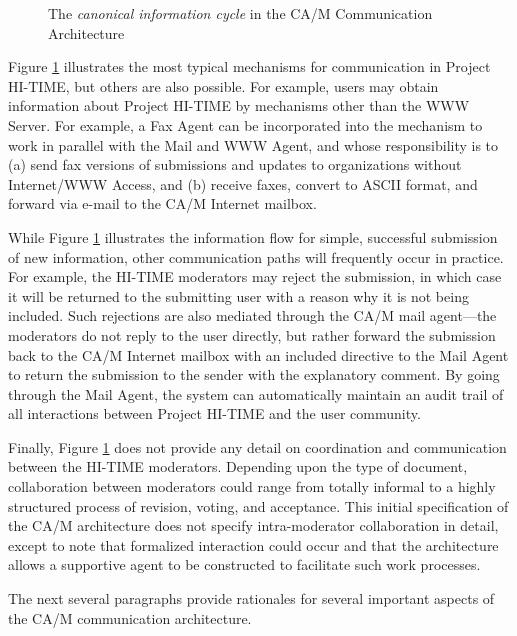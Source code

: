\begin{figure}[htbp]
  \centerline{} 
\caption{The {\em canonical information cycle} in the CA/M Communication Architecture} 
\label{fig:communication-architecture}
\end{figure}

Figure \ref{fig:communication-architecture} 
illustrates the most typical mechanisms for communication in Project HI-TIME, but
others are also possible.  For example, users may obtain information about
Project HI-TIME by mechanisms other than the WWW Server.  For example, a
Fax Agent can be incorporated into the mechanism to work in parallel with
the Mail and WWW Agent, and whose responsibility is to (a) send fax
versions of submissions and updates to organizations without Internet/WWW
Access, and (b) receive faxes, convert to ASCII format, and forward via
e-mail to the CA/M Internet mailbox.  

While Figure \ref{fig:communication-architecture} illustrates the
information flow for simple, successful submission of new information,
other communication paths will frequently occur in practice.  For example,
the HI-TIME moderators may reject the submission, in which case it will be
returned to the submitting user with a reason why it is not being included.
Such rejections are also mediated through the CA/M mail agent---the
moderators do not reply to the user directly, but rather forward the
submission back to the CA/M Internet mailbox with an included directive to
the Mail Agent to return the submission to the sender with the explanatory
comment.  By going through the Mail Agent, the system can automatically
maintain an audit trail of all interactions between Project HI-TIME and the
user community.

Finally, Figure \ref{fig:communication-architecture} does not provide any
detail on coordination and communication between the HI-TIME moderators.
Depending upon the type of document, collaboration between moderators could
range from totally informal to a highly structured process of revision,
voting, and acceptance. This initial specification of the CA/M architecture
does not specify intra-moderator collaboration in detail, except to note
that formalized interaction could occur and that the architecture allows a
supportive agent to be constructed to facilitate such work processes.

The next several paragraphs provide rationales for several important
aspects of the CA/M communication architecture.

